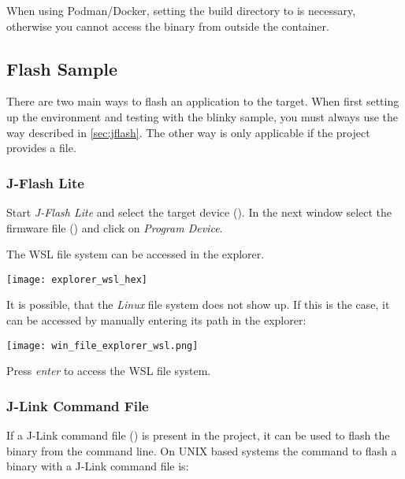 \begin{infobox}
  When using Podman/Docker, setting the build directory to  is necessary, otherwise you cannot access the binary from outside the container.
\end{infobox}


\newpage

\subsection{Flash Sample}
There are two main ways to flash an application to the target.
When first setting up the environment and testing with the blinky sample, you must always use the way described in \autoref{sec:jflash}.
The other way is only applicable if the project provides a  file.

\subsubsection{J-Flash Lite}\label{sec:jflash}
Start \emph{J-Flash Lite} and select the target device (\emph{\mcu{}}).
In the next window select the firmware file () and click on \emph{Program Device}.


\begin{infobox}
  The WSL file system can be accessed in the explorer.
  \begin{center}
    \texttt{[image: explorer\_wsl\_hex]}
  \end{center}

  It is possible, that the \emph{Linux} file system does not show up.
  If this is the case, it can be accessed by manually entering its path in the explorer:
  \mono{\\\\wsl\$}
  \begin{center}
    \texttt{[image: win\_file\_explorer\_wsl.png]}
  \end{center}
  Press \emph{enter} to access the WSL file system.
\end{infobox}

\newpage

\subsubsection{J-Link Command File}
If a J-Link command file () is present in the project, it can be used to flash the binary from the command line.
On UNIX based systems the command to flash a binary with a J-Link command file is:

